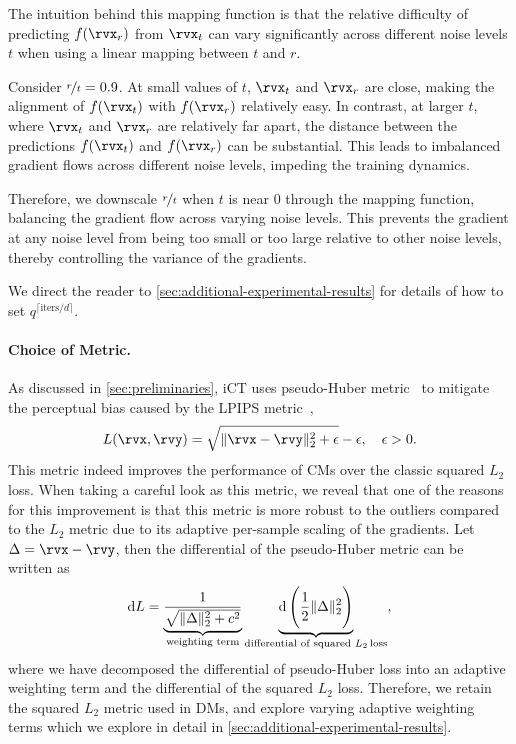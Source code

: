 The intuition behind this mapping function is that the relative difficulty of predicting $f(\x_r)$ from $\x_t$ can vary significantly across different noise levels $t$ when using a linear mapping between $t$ and $r$.

Consider $\nicefrac{r}{t} = 0.9$. At small values of $t$, $\x_t$ and $\x_r$ are close, making the alignment of $f(\x_t)$ with $f(\x_r)$ relatively easy. In contrast, at larger $t$, where $\x_t$ and $\x_r$ are relatively far apart, the distance between the predictions $f(\x_t)$ and $f(\x_r)$ can be substantial. This leads to imbalanced gradient flows across different noise levels, impeding the training dynamics.

Therefore, we downscale $\nicefrac{r}{t}$ when $t$ is near $0$ through the mapping function, balancing the gradient flow across varying noise levels. 
This prevents the gradient at any noise level from being too small or too large relative to other noise levels, thereby controlling the variance of the gradients. 

We direct the reader to \cref{sec:additional-experimental-results} for details of how to set $q^{\lceil\text{iters}/d\rceil}$.

\paragraph{Choice of Metric.}
As discussed in \cref{sec:preliminaries}, iCT uses pseudo-Huber metric~\citep{huber} to mitigate the perceptual bias caused by the LPIPS metric~\citep{lpips}, 
\begin{align}
L(\x, \y) = \sqrt{\| \x - \y \|_2^2 + \epsilon} - \epsilon, \quad \epsilon > 0.
\end{align}
%
This metric indeed improves the performance of CMs over the classic squared $L_2$ loss. When taking a careful look as this metric, we reveal that one of the reasons for this improvement is that this metric is more robust to the outliers compared to the $L_2$ metric due to its adaptive per-sample scaling of the gradients.
Let $\Delta = \x - \y$, then the differential of the pseudo-Huber metric can be written as
%
\begin{equation}
\label{eq:grad-huber}
\mathrm{d} L = \underbrace{\frac{1}{\sqrt{\|\Delta\|_2^2 + c^2}} \vphantom{\mathrm{d} \left( \frac{1}{2} \|\Delta\|_2^2 \right)} }_{\text{weighting term}} \underbrace{\mathrm{d} \left( \frac{1}{2} \|\Delta\|_2^2 \vphantom{\frac{1}{\sqrt{\|\Delta\|_2^2 + \epsilon}}}\right)}_{\text{differential of 
 squared } L_2 \text{\,loss}},
\end{equation}
%
where we have decomposed the differential of pseudo-Huber loss into an adaptive weighting term and the differential of the squared $L_2$ loss.
Therefore, we retain the squared $L_2$ metric used in DMs, and explore varying adaptive weighting terms which we explore in detail in \cref{sec:additional-experimental-results}.

